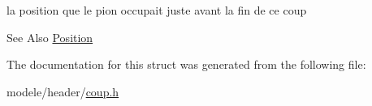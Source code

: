 la position que le pion occupait juste avant la fin de ce coup 

\begin{DoxySeeAlso}{See Also}
\hyperlink{struct_position}{Position} 
\end{DoxySeeAlso}


The documentation for this struct was generated from the following file\-:\begin{DoxyCompactItemize}
\item 
modele/header/\hyperlink{coup_8h}{coup.\-h}\end{DoxyCompactItemize}
